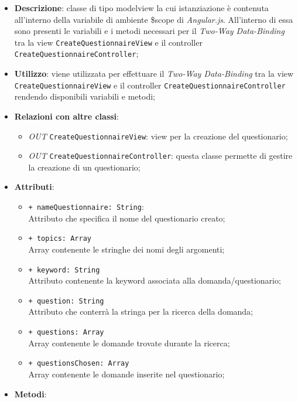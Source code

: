 	\begin{itemize}
		\item \textbf{Descrizione}: classe di tipo modelview la cui istanziazione è contenuta all'interno della variabile di ambiente \$scope di \textit{Angular.js}. All'interno di essa sono presenti le variabili e i metodi necessari per il \textit{Two-Way Data-Binding} tra la view \texttt{CreateQuestionnaireView} e il controller \texttt{CreateQuestionnaireController};
		\item \textbf{Utilizzo}: viene utilizzata per effettuare il \textit{Two-Way Data-Binding} tra la view \texttt{CreateQuestionnaireView} e il controller \texttt{CreateQuestionnaireController} rendendo disponibili variabili e metodi;
		\item \textbf{Relazioni con altre classi}: 
		\begin{itemize}
			\item \textit{OUT} \texttt{CreateQuestionnaireView}: view per la creazione del questionario; 
			\item \textit{OUT} \texttt{CreateQuestionnaireController}: questa classe permette di gestire la creazione di un questionario;
		\end{itemize}
		\item \textbf{Attributi}: 
		\begin{itemize}
			\item \texttt{+ nameQuestionnaire: String}: \\ Attributo che specifica il nome del questionario creato;
			\item \texttt{+ topics: Array} \\ Array contenente le stringhe dei nomi degli argomenti;
			\item \texttt{+ keyword: String} \\ Attributo contenente la keyword associata alla domanda/questionario;
			\item \texttt{+ question: String} \\ Attributo che conterrà la stringa per la ricerca della domanda;
			\item \texttt{+ questions: Array} \\ Array contenente le domande trovate durante la ricerca;
			\item \texttt{+ questionsChosen: Array} \\ Array contenente le domande inserite nel questionario;
		\end{itemize}
		\item \textbf{Metodi}: 

\end{itemize}
